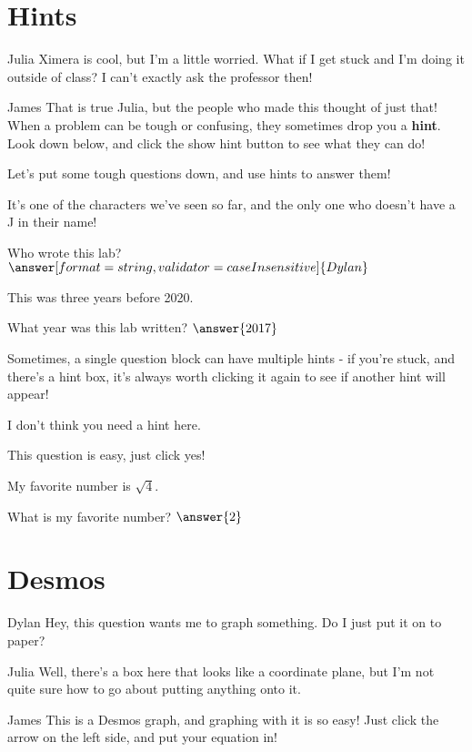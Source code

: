 \documentclass{ximera}
\begin{document}
\section{Hints}
\begin{dialogue}
\item[Julia] Ximera is cool, but I'm a little worried. What if I get stuck and I'm doing it outside of class? I can't exactly ask the professor then!
\item[James] That is true Julia, but the people who made this thought of just that! When a problem can be tough or confusing, they sometimes drop you a \textbf{hint}. Look down below, and click the show hint button to see what they can do!
\end{dialogue}

Let's put some tough questions down, and use hints to answer them!
\begin{question}
\begin{hint}
It's one of the characters we've seen so far, and the only one who doesn't have a J in their name!
\end{hint}
Who wrote this lab?
$\answer[format=string, validator = caseInsensitive]{Dylan}$
\end{question}
\begin{question}
\begin{hint}
This was three years before 2020.
\end{hint}
What year was this lab written?
$\answer{2017}$
\end{question}

Sometimes, a single question block can have multiple hints - if you're stuck, and there's a hint box, it's always worth clicking it again to see if another hint will appear!

\begin{question}
\begin{hint}
I don't think you need a hint here.
\end{hint}
This question is easy, just click yes!
\begin{multipleChoice}
\end{multipleChoice}

\begin{hint}
My favorite number is $\sqrt{4}$.
\end{hint}
What is my favorite number?
$\answer{2}$
\end{question}

\section{Desmos}
\begin{dialogue}
\item[Dylan] Hey, this question wants me to graph something. Do I just put it on to paper?
\item[Julia] Well, there's a box here that looks like a coordinate plane, but I'm not quite sure how to go about putting anything onto it.
\item[James] This is a Desmos graph, and graphing with it is so easy! Just click the arrow on the left side, and put your equation in!
\end{dialogue}
\end{document}
